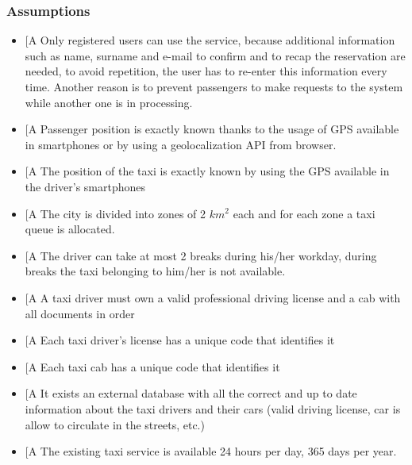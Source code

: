 \documentclass[a4paper,12pt]{article}%
\newcounter{assumptions_counter}
\begin{document}
\subsubsection{Assumptions}
\begin{itemize}
\item \label{a\arabic{assumptions_counter}}{[}A\arabic{assumptions_counter}{]}
Only registered users can use the service, because additional information such as name, surname and e-mail to confirm and to recap the reservation are needed, to avoid repetition, the user has to re-enter this information every time.
Another reason is to prevent passengers to make requests to the system while another one is in processing.
\item \label{a\arabic{assumptions_counter}}{[}A\arabic{assumptions_counter}{]} Passenger position is exactly known thanks to the usage of GPS available in smartphones or by using a geolocalization API from browser. 
\item \label{a\arabic{assumptions_counter}}{[}A\arabic{assumptions_counter}{]} The position of the taxi is exactly known by using the GPS available in the driver's smartphones
\item \label{a\arabic{assumptions_counter}}{[}A\arabic{assumptions_counter}{]} The city is divided into zones of 2 $km^2$ each and for each zone a taxi queue is allocated.
\item \label{a\arabic{assumptions_counter}}{[}A\arabic{assumptions_counter}{]} The driver can take at most 2 breaks during his/her workday, during breaks the taxi belonging to him/her is not available.
\item \label{a\arabic{assumptions_counter}}{[}A\arabic{assumptions_counter}{]} A taxi driver must own a valid professional driving license and a cab with all documents in order
\item \label{a\arabic{assumptions_counter}}{[}A\arabic{assumptions_counter}{]} Each taxi driver's license has a unique code that identifies it
\item \label{a\arabic{assumptions_counter}}{[}A\arabic{assumptions_counter}{]} Each taxi cab has a unique code that identifies it
\item \label{a\arabic{assumptions_counter}}{[}A\arabic{assumptions_counter}{]} It exists an external database with all the correct and up to date information about the taxi drivers and their cars (valid driving license, car is allow to circulate in the streets, etc.)
\item \label{a\arabic{assumptions_counter}}{[}A\arabic{assumptions_counter}{]} The existing taxi service is available 24 hours per day, 365 days per year.
\end{itemize}
\end{document}
